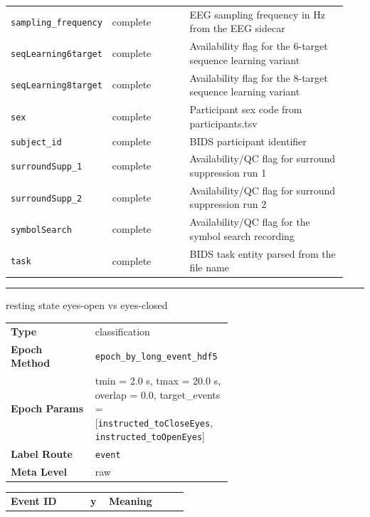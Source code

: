 {\begin{tcolorbox}
\begin{tabular}{@{}p{0.2350\linewidth}p{0.2350\linewidth}p{0.4700\linewidth}@{}}
\texttt{sampling\_\allowbreak{}frequency} & complete & EEG sampling frequency in Hz from the EEG sidecar \\
\texttt{seqLearning6target} & complete & Availability flag for the 6-target sequence learning variant \\
\texttt{seqLearning8target} & complete & Availability flag for the 8-target sequence learning variant \\
\texttt{sex} & complete & Participant sex code from participants.tsv \\
\texttt{subject\_\allowbreak{}id} & complete & BIDS participant identifier \\
\texttt{surroundSupp\_\allowbreak{}1} & complete & Availability/QC flag for surround suppression run 1 \\
\texttt{surroundSupp\_\allowbreak{}2} & complete & Availability/QC flag for surround suppression run 2 \\
\texttt{symbolSearch} & complete & Availability/QC flag for the symbol search recording \\
\texttt{task} & complete & BIDS task entity parsed from the file name \\
\bottomrule
\end{tabular}
\endgroup
\noindent\rule{\linewidth}{0.7pt}\par\nopagebreak
{}
 {\footnotesize resting state eyes-open vs eyes-closed}\par\smallskip
{\footnotesize\begin{tabular}{@{}lp{0.62\linewidth}@{}}
\textbf{Type} & classification \\
\textbf{Epoch Method} & \texttt{epoch\_by\_long\_event\_hdf5} \\
\textbf{Epoch Params} & tmin = 2.0 s, tmax = 20.0 s, overlap = 0.0, target\_events = [\texttt{instructed\_toCloseEyes}, \texttt{instructed\_toOpenEyes}] \\
\textbf{Label Route} & \texttt{event} \\
\textbf{Meta Level} & raw \\
\end{tabular}}
\par{}\par\smallskip
\begingroup\footnotesize
\begin{tabular}{@{}p{0.3911\linewidth}p{0.0978\linewidth}p{0.3911\linewidth}@{}}
\toprule
\textbf{Event ID} & \textbf{y} & \textbf{Meaning} \\

\end{tabular}
\end{tcolorbox}}
